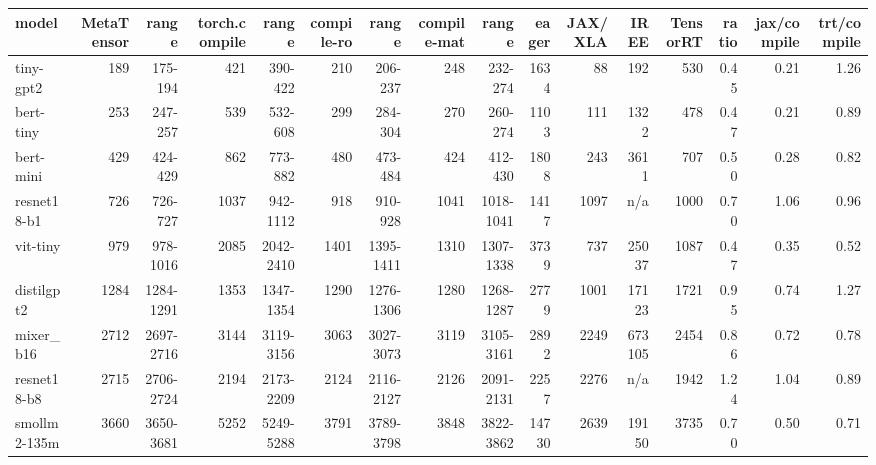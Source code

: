 \begin{tabular}{lrrrrrrrrrrrrrrr}
\toprule
model & MetaTensor & range & torch.compile & range & compile-ro & range & compile-mat & range & eager & JAX/XLA & IREE & TensorRT & ratio & jax/compile & trt/compile \\
\midrule
tiny-gpt2 & 189 & 175-194 & 421 & 390-422 & 210 & 206-237 & 248 & 232-274 & 1634 & 88 & 192 & 530 & 0.45 & 0.21 & 1.26 \\
bert-tiny & 253 & 247-257 & 539 & 532-608 & 299 & 284-304 & 270 & 260-274 & 1103 & 111 & 1322 & 478 & 0.47 & 0.21 & 0.89 \\
bert-mini & 429 & 424-429 & 862 & 773-882 & 480 & 473-484 & 424 & 412-430 & 1808 & 243 & 3611 & 707 & 0.50 & 0.28 & 0.82 \\
resnet18-b1 & 726 & 726-727 & 1037 & 942-1112 & 918 & 910-928 & 1041 & 1018-1041 & 1417 & 1097 & n/a & 1000 & 0.70 & 1.06 & 0.96 \\
vit-tiny & 979 & 978-1016 & 2085 & 2042-2410 & 1401 & 1395-1411 & 1310 & 1307-1338 & 3739 & 737 & 25037 & 1087 & 0.47 & 0.35 & 0.52 \\
distilgpt2 & 1284 & 1284-1291 & 1353 & 1347-1354 & 1290 & 1276-1306 & 1280 & 1268-1287 & 2779 & 1001 & 17123 & 1721 & 0.95 & 0.74 & 1.27 \\
mixer\_b16 & 2712 & 2697-2716 & 3144 & 3119-3156 & 3063 & 3027-3073 & 3119 & 3105-3161 & 2892 & 2249 & 673105 & 2454 & 0.86 & 0.72 & 0.78 \\
resnet18-b8 & 2715 & 2706-2724 & 2194 & 2173-2209 & 2124 & 2116-2127 & 2126 & 2091-2131 & 2257 & 2276 & n/a & 1942 & 1.24 & 1.04 & 0.89 \\
smollm2-135m & 3660 & 3650-3681 & 5252 & 5249-5288 & 3791 & 3789-3798 & 3848 & 3822-3862 & 14730 & 2639 & 19150 & 3735 & 0.70 & 0.50 & 0.71 \\
\bottomrule
\end{tabular}
